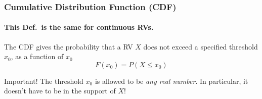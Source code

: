 
\begin{frame}
\frametitle{Cumulative Distribution Function (CDF)}
\framesubtitle{This Def.\ is \alert{the same} for continuous RVs.}

The CDF gives the probability that a RV $X$ \alert{does not exceed} a specified threshold $x_0$, as a function of $x_0$
	$$F(x_0) = P(X \leq x_0)$$


 

\begin{alertblock}{Important!}
The threshold $x_0$ is allowed to be \emph{any real number}. In particular, it doesn't have to be in the support of $X$! 
\end{alertblock}

\end{frame}


